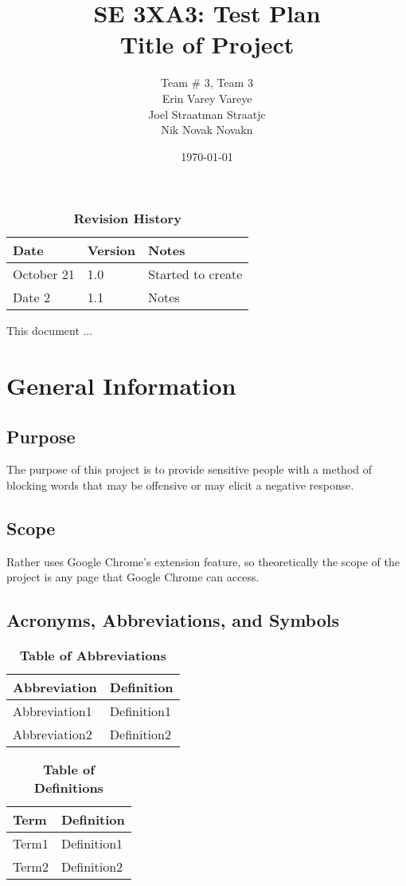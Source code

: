 \documentclass[12pt, titlepage]{article}
\title{SE 3XA3: Test Plan\\Title of Project}
\author{Team \# 3, Team 3
		\\ Erin Varey Vareye
		\\ Joel Straatman Straatjc
		\\ Nik Novak 	Novakn
}
\date{\today}
\begin{document}
\maketitle
{}
\tableofcontents
\listoftables
\listoffigures
\begin{table}[bp]
\caption{\bf Revision History}
\begin{tabularx}{\textwidth}{p{3cm}p{2cm}X}
\toprule {\bf Date} & {\bf Version} & {\bf Notes}\\
\midrule
October 21 & 1.0 & Started to create\\
Date 2 & 1.1 & Notes\\
\bottomrule
\end{tabularx}
\end{table}
\newpage
{}
This document ...
\section{General Information}
\subsection{Purpose}
The purpose of this project is to provide sensitive people with a method of blocking words that may be offensive or may elicit a negative response.
\subsection{Scope}
Rather uses Google Chrome's extension feature, so theoretically the scope of the project is any page that Google Chrome can access.
\subsection{Acronyms, Abbreviations, and Symbols}
	
\begin{table}[hbp]
\caption{\textbf{Table of Abbreviations}} \label{Table}
\begin{tabularx}{\textwidth}{p{3cm}X}
\toprule
\textbf{Abbreviation} & \textbf{Definition} \\
\midrule
Abbreviation1 & Definition1\\
Abbreviation2 & Definition2\\
\bottomrule
\end{tabularx}
\end{table}
\begin{table}[!htbp]
\caption{\textbf{Table of Definitions}} \label{Table}
\begin{tabularx}{\textwidth}{p{3cm}X}
\toprule
\textbf{Term} & \textbf{Definition}\\
\midrule
Term1 & Definition1\\
Term2 & Definition2\\
\bottomrule
\end{tabularx}
\end{table}	
\end{document}

